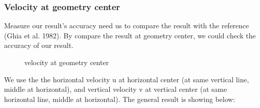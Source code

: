 \documentclass[12pt]{article}
\begin{document}
\subsubsection{Velocity at geometry center}


Measure our result's accuracy need us to compare the result with the reference (Ghia et al. 1982)\cite{GHIA1982387}. By compare the result at geometry center, we could check the accuracy of our result. 







\begin{figure}[H]
    \centering
    \caption{velocity at geometry center}
\end{figure}


We use the the horizontal velocity u at horizontal center (at same vertical line, middle at horizontal), and vertical velocity v at vertical center (at same horizontal line, middle at horizontal). The general result is showing below:
\end{document}
